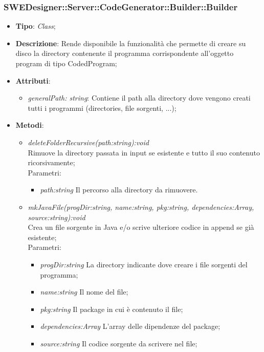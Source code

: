 \documentclass[../DefinizioneDiProdotto.tex]{subfiles}
\begin{document}
			
			\subsubsection{SWEDesigner::Server::CodeGenerator::Builder::Builder}
			\hypertarget{SWEDesigner::Server::CodeGenerator::Builder::Builder}{}
			\begin{itemize}
				\item \textbf{Tipo}: \emph{Class};
				\item \textbf{Descrizione}: Rende disponibile la funzionalità che permette di creare su disco la directory contenente il programma corrispondente all'oggetto program di tipo CodedProgram; \\
				\item \textbf{Attributi}:
				\begin{itemize}
					\item \emph{generalPath: string}: Contiene il path alla directory dove vengono creati tutti i programmi (directories, file sorgenti, ...);
				\end{itemize}
				\item \textbf{Metodi}:
				\begin{itemize}
					\item \emph{deleteFolderRecursive(path:string):void} \\ 
					Rimuove la directory passata in input se esistente e tutto il suo contenuto ricorsivamente; \\
					Parametri:
					\begin{itemize}
						\item \emph{path:string} Il percorso alla directory da rimuovere.
					\end{itemize}
					
					\item \emph{mkJavaFile(progDir:string, name:string, pkg:string, dependencies:Array, source:string):void} \\ 
					Crea un file sorgente in Java e/o scrive ulteriore codice in append se già esistente; \\
					Parametri:
					\begin{itemize}
						\item \emph{progDir:string} La directory indicante dove creare i file sorgenti del programma;
						\item \emph{name:string} Il nome del file;
						\item \emph{pkg:string} Il package in cui è contenuto il file;
						\item \emph{dependencies:Array} L'array delle dipendenze del package;
						\item \emph{source:string} Il codice sorgente da scrivere nel file;
					\end{itemize}
					

\end{itemize}
\end{itemize}
\end{document}
